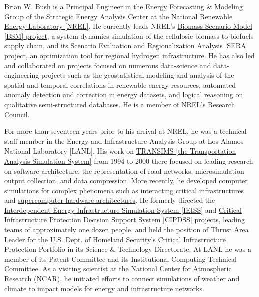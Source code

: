 \documentclass[]{article}
\begin{document}
Brian W. Bush is a Principal Engineer in the
\href{http://www.nrel.gov/analysis/staff_efm.html}{Energy Forecasting \&
Modeling Group} of the
\href{http://www.nrel.gov/analysis/about_office.html}{Strategic Energy
Analysis Center} at the \href{http://www.nrel.gov/}{National Renewable
Energy Laboratory {[}NREL{]}}. He currently leads NREL's
\href{projects/bsm.html}{Biomass Scenario Model {[}BSM{]} project}, a
system-dynamics simulation of the cellulosic biomass-to-biofuels supply
chain, and its \href{projects/sera.html}{Scenario Evaluation and
Regionalization Analysis {[}SERA{]} project}, an optimization tool for
regional hydrogen infrastructure. He has also led and collaborated on
projects focused on numerous data-science and data-engineering projects
such as the geostatistical modeling and analysis of the spatial and
temporal correlations in renewable energy resources, automated anomaly
detection and correction in energy datasets, and logical reasoning on
qualitative semi-structured databases. He is a member of NREL's Research
Council.

For more than seventeen years prior to his arrival at NREL, he was a
technical staff member in the Energy and Infrastructure Analysis Group
at Los Alamos National Laboratory {[}LANL{]}. His work on
\href{projects/transims.html}{TRANSIMS {[}the Transportation Analysis
Simulation System{]}} from 1994 to 2000 there focused on leading
research on software architecture, the representation of road networks,
microsimulation output collection, and data compression. More recently,
he developed computer simulations for complex phenomena such as
\href{projects/infrastructure.html}{interacting critical
infrastructures} and \href{projects/a-la-carte.html}{supercomputer
hardware architectures}. He formerly directed the
\href{projects/ieiss.html}{Interdependent Energy Infrastructure
Simulation System {[}IEISS{]}} and \href{projects/cipdss.html}{Critical
Infrastructure Protection Decision Support System {[}CIPDSS{]}}
projects, leading teams of approximately one dozen people, and held the
position of Thrust Area Leader for the U.S. Dept. of Homeland Security's
Critical Infrastructure Protection Portfolio in its Science \&
Technology Directorate. At LANL he was a member of its Patent Committee
and its Institutional Computing Technical Committee. As a visiting
scientist at the National Center for Atmospheric Research (NCAR), he
initiated efforts to \href{projects/weather-impacts.html}{connect
simulations of weather and climate to impact models for energy and
infrastructure networks}.
\end{document}
